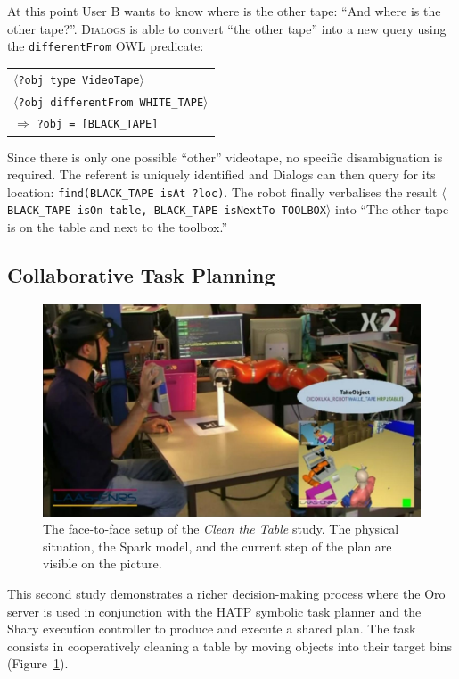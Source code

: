 \documentclass[preprint,3p,times]{elsarticle}
\newcommand{\concept}[1]{{\small \texttt{#1}}}
\newcommand{\stmt}[1]{{\footnotesize\tt$\langle$#1\relax$\rangle$}}
\begin{document}
At this point User B wants to know where is the other tape: ``And where is the
other tape?''. \textsc{Dialogs} is able to convert ``the other tape'' into a new
query using the
\concept{differentFrom} OWL predicate:

\begin{center}
\begin{tabular}{l}
\stmt{?obj type VideoTape}\\
\stmt{?obj differentFrom WHITE\_TAPE}\\
\hspace{0.7cm}$\Rightarrow$ \concept{?obj = [BLACK\_TAPE]}
\end{tabular}
\end{center}

Since there is only one possible ``other'' videotape, no specific
disambiguation is required. The referent is uniquely identified and {\sc
Dialogs} can then query for its location: \concept{find(BLACK\_TAPE isAt ?loc)}. The robot finally verbalises the
result \stmt{BLACK\_TAPE isOn table, BLACK\_TAPE isNextTo TOOLBOX} into ``The
other tape is on the table and next to the toolbox.''

\subsection{Collaborative Task Planning}
\label{sec:cleantable}

\begin{figure}[ht!]
    \centering
    \includegraphics[width=0.6\columnwidth]{cleantable.jpg}

    \caption{The face-to-face setup of the \emph{Clean the Table} study. The
    physical situation, the {\sc Spark} model, and the current step of the plan
    are visible on the picture.}

    \label{fig|cleantable-video}
\end{figure}

This second study demonstrates a richer decision-making process where the {\sc
Oro} server is used in conjunction with the HATP symbolic task planner and the
{\sc Shary} execution controller to produce and execute a shared plan. The task
consists in cooperatively cleaning a table by moving objects into their target
bins (Figure~\ref{fig|cleantable-video}).
\end{document}
